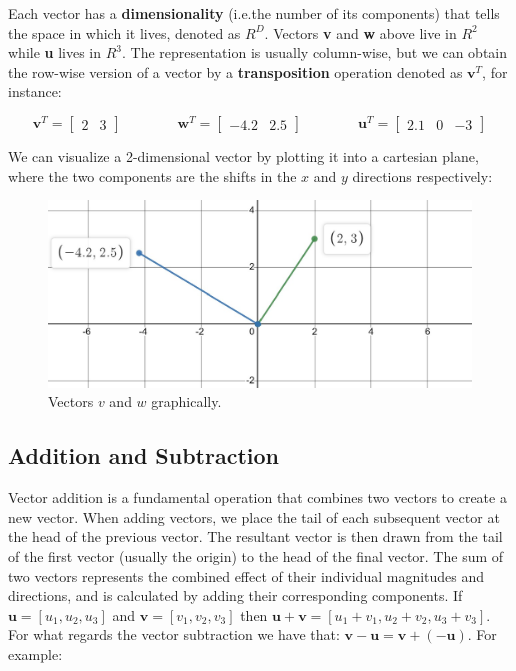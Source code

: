 \documentclass[
	11pt, %
	fleqn, %
	a4paper, %
]{LegrandOrangeBook}
\begin{document}
Each vector has a \textbf{dimensionality} (i.e.the number of its components) that tells the space in which it lives, denoted as $R^{D}$.
Vectors \textbf{v} and \textbf{w} above live in $R^{2}$ while \textbf{u} lives in $R^{3}$. The representation is usually column-wise,
but we can obtain the row-wise version of a vector by a \textbf{transposition} operation denoted as $\textbf{v}^{T}$, for instance:

$$ \textbf{v}^{T} =
	\begin{bmatrix}
		2 & 3
	\end{bmatrix} \quad\quad\quad\quad \textbf{w}^{T} = \begin{bmatrix} -4.2 & 2.5 \end{bmatrix} \quad\quad\quad\quad \textbf{u}^{T} = \begin{bmatrix} 2.1 & 0 & -3  \end{bmatrix}
$$

We can visualize a 2-dimensional vector by plotting it into a cartesian plane, where the two components are the shifts in the $x$ and $y$ directions respectively:

\begin{figure}[h]
	\caption{Vectors $v$ and $w$ graphically.}
	\centering
	\includegraphics[scale = 0.6]{Images/vector_plot_1.jpg}
\end{figure}

\subsection{Addition and Subtraction}

Vector addition is a fundamental operation that combines two vectors to create a new vector.
When adding vectors, we place the tail of each subsequent vector at the head of the previous vector. The resultant vector is then drawn from the tail of the
first vector (usually the origin) to the head of the final vector. The sum of two vectors represents the combined effect
of their individual magnitudes and directions, and is calculated by adding their corresponding components.
If $\textbf{u} = [u_{1}, u_{2}, u_{3}]$ and $\textbf{v} = [v_{1}, v_{2}, v_{3}]$ then $\textbf{u} + \textbf{v} = [u_{1} + v_{1}, u_{2} + v_{2}, u_{3} + v_{3}]$.
For what regards the vector subtraction we have that: $\textbf{v} - \textbf{u} = \textbf{v} + (- \textbf{u})$. For example:
\end{document}
